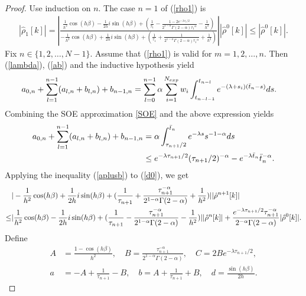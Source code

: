 \documentclass[10pt, reqno]{amsart}
\theoremstyle{remark}
\theoremstyle{definition}
\numberwithin{table}{section}
\begin{document}
\begin{proof}
Use induction on $n$. The case $n=1$ of (\ref{rho1}) is
\begin{align}
    |\hat{\rho}_{1}[k]|=\left|\frac{\frac{1}{h^2}\cos(h\beta)-\frac{1}{2h}i\sin(h\beta)+(\frac{1}{\tau_{1}}-\frac{1-2e^{-\lambda {\tau_{1}}/{2}}}{2^{1-\alpha}\Gamma(2-\alpha){\tau_{1}}^\alpha}-\frac{1}{h^2}) }{-\frac{1}{h^2}\cos(h\beta)+\frac{1}{2h}i\sin(h\beta)+(\frac{1}{\tau_{1}}+\frac{1}{2^{1-\alpha}\Gamma(2-\alpha){\tau_{1}}^\alpha}+\frac{1}{h^2}) }\right||\hat{\rho}^{0}[k]| \leq |\hat{\rho}^{0}[k]|.
\end{align}
Fix $n\in \{1,2,\dots,N-1\}$. Assume that (\ref{rho1}) is valid for \(m=1,2,\dots,n\). Then (\ref{lambda}), (\ref{ab})
and the inductive hypothesis yield
\begin{align}
  a_{0,n}+\sum_{l=1}^{n-1}(a_{l, n}+b_{l, n})+b_{n-1,n}  
  &=\sum_{l=0}^{n-1}\alpha \sum_{i=1}^{N_{exp}}w_i\int_{t_{n-l-1}}^{t_{n-l}}e^{-(\lambda+s_i)(\bar{t}_n-s)}ds.\notag
\end{align}
Combining the SOE approximation \eqref{SOE} and the above expression yields
\begin{align}
  a_{0,n}+\sum_{l=1}^{n-1}(a_{l, n}+b_{l, n})+b_{n-1,n}  
&=\alpha\int_{{\tau_{n+1}}/{2}}^{\bar{t}_n}{e^{-\lambda s}}{s^{-1-\alpha}}ds\notag\\
  &\leq {e^{-\lambda {\tau_{n+1}}/{2}}}{({\tau_{n+1}}/{2})^{-\alpha}}-{e^{-\lambda \bar{t}_n}}{\bar{t}_n^{-\alpha}}.\label{aplusb}
\end{align}
Applying the inequality (\ref{aplusb}) to (\ref{d0}), we get
\begin{align}
    &|-\frac{1}{h^2}\cos(h\beta)+\frac{1}{2h}i\sin(h\beta)+(\frac{1}{\tau_{n+1}}+\frac{\tau_{n+1}^{-\alpha}}{2^{1-\alpha}\Gamma(2-\alpha)}+\frac{1}{h^2}) ||\hat{\rho}^{n+1}[k]|\notag \\
    \leq&|\frac{1}{h^2}\cos(h\beta)-\frac{1}{2h}i\sin(h\beta)+(\frac{1}{\tau_{n+1}}-\frac{\tau_{n+1}^{-\alpha}}{2^{1-\alpha}\Gamma(2-\alpha)}-\frac{1}{h^2}) ||\hat{\rho}^{n}[k]| +\frac{e^{-\lambda {\tau_{n+1}}/{2}}\tau_{n+1}^{-\alpha}}{2^{-\alpha}\Gamma(2-\alpha)}|\hat{\rho}^{0}[k]|.\label{need1}
\end{align}
Define
\begin{align*}
A &= \frac{1-\cos(h\beta)}{h^2},\quad B=\frac{\tau_{n+1}^{-\alpha}}{2^{1-\alpha}\Gamma(2-\alpha)},\quad C=2Be^{-\lambda{\tau_{n+1}}/{2}},\\
a&=-A+\frac{1}{\tau_{n+1}}-B,\quad b=A+\frac{1}{\tau_{n+1}}+B,\quad d=\frac{\sin(h\beta)}{2h}.
\end{align*}

\end{proof}
\end{document}
